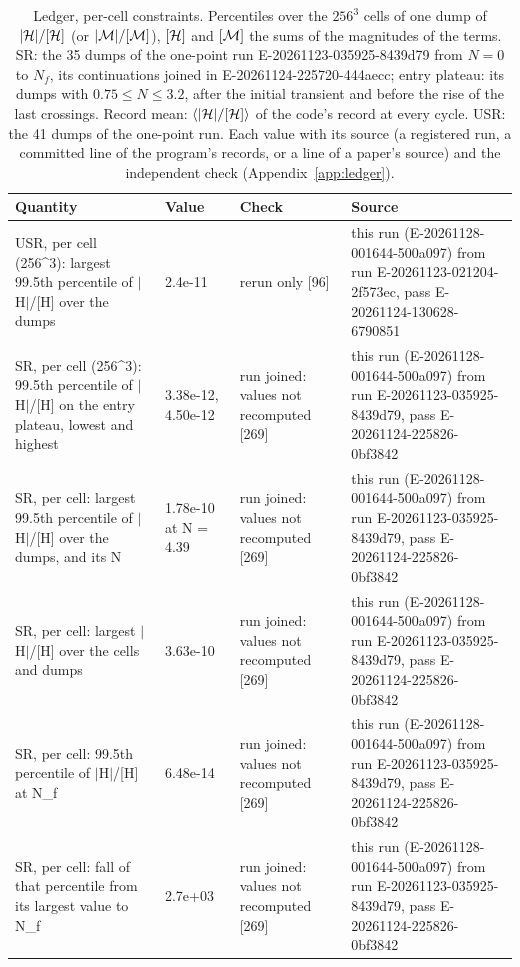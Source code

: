 \begin{table}
\caption{Ledger, per-cell constraints. Percentiles over the $256^3$ cells of one dump of $|\mathcal{H}|/[\mathcal{H}]$ (or $|\mathcal{M}|/[\mathcal{M}]$), $[\mathcal{H}]$ and $[\mathcal{M}]$ the sums of the magnitudes of the terms. SR: the 35 dumps of the one-point run E-20261123-035925-8439d79 from $N = 0$ to $N_f$, its continuations joined in E-20261124-225720-444aecc; entry plateau: its dumps with $0.75 \le N \le 3.2$, after the initial transient and before the rise of the last crossings. Record mean: $\langle|\mathcal{H}|/[\mathcal{H}]\rangle$ of the code's record at every cycle. USR: the 41 dumps of the one-point run. Each value with its source (a registered run, a committed line of the program's records, or a line of a paper's source) and the independent check (Appendix~\ref{app:ledger}).}
\label{tab:ledgerpercellconstraints}
\footnotesize
\begin{tabular}{p{}p{}p{}p{}}
\toprule
Quantity & Value & Check & Source \\
\midrule
USR, per cell (256\^{}3): largest 99.5th percentile of $|$H$|$/\allowbreak{}[H] over the dumps & 2.4e-11 & rerun only [96] & this run (E-20261128-001644-500a097) from run E-20261123-021204-2f573ec, pass E-20261124-130628-6790851 \\
SR, per cell (256\^{}3): 99.5th percentile of $|$H$|$/\allowbreak{}[H] on the entry plateau, lowest and highest & 3.38e-12, 4.50e-12 & run joined: values not recomputed [269] & this run (E-20261128-001644-500a097) from run E-20261123-035925-8439d79, pass E-20261124-225826-0bf3842 \\
SR, per cell: largest 99.5th percentile of $|$H$|$/\allowbreak{}[H] over the dumps, and its N & 1.78e-10 at N = 4.39 & run joined: values not recomputed [269] & this run (E-20261128-001644-500a097) from run E-20261123-035925-8439d79, pass E-20261124-225826-0bf3842 \\
SR, per cell: largest $|$H$|$/\allowbreak{}[H] over the cells and dumps & 3.63e-10 & run joined: values not recomputed [269] & this run (E-20261128-001644-500a097) from run E-20261123-035925-8439d79, pass E-20261124-225826-0bf3842 \\
SR, per cell: 99.5th percentile of $|$H$|$/\allowbreak{}[H] at N\_f & 6.48e-14 & run joined: values not recomputed [269] & this run (E-20261128-001644-500a097) from run E-20261123-035925-8439d79, pass E-20261124-225826-0bf3842 \\
SR, per cell: fall of that percentile from its largest value to N\_f & 2.7e+03 & run joined: values not recomputed [269] & this run (E-20261128-001644-500a097) from run E-20261123-035925-8439d79, pass E-20261124-225826-0bf3842 \\

\end{tabular}
\end{table}
